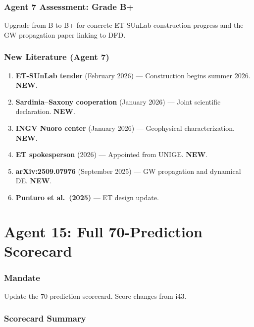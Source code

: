 \documentclass[11pt,a4paper]{article}
\newcommand{\NEW}{\textcolor{dfdblue}{\textbf{NEW}}}
\begin{document}
\section{Agent 7 Assessment: Grade B+}

Upgrade from B to B+ for concrete ET-SUnLab construction progress and the GW propagation paper linking to DFD.

\section{New Literature (Agent 7)}

\begin{enumerate}
\item \textbf{ET-SUnLab tender} (February 2026) --- Construction begins summer 2026. \NEW.
\item \textbf{Sardinia--Saxony cooperation} (January 2026) --- Joint scientific declaration. \NEW.
\item \textbf{INGV Nuoro center} (January 2026) --- Geophysical characterization. \NEW.
\item \textbf{ET spokesperson} (2026) --- Appointed from UNIGE. \NEW.
\item \textbf{arXiv:2509.07976} (September 2025) --- GW propagation and dynamical DE. \NEW.
\item \textbf{Punturo et al.\ (2025)} --- ET design update.
\end{enumerate}


\part{Agent 15: Full 70-Prediction Scorecard}
\label{part:agent15}

\section{Mandate}

Update the 70-prediction scorecard. Score changes from i43.

\section{Scorecard Summary}
\end{document}
